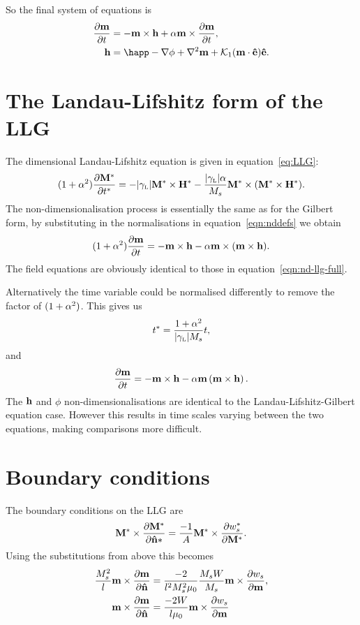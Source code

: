 So the final system of equations is
\begin{equation}
  \begin{aligned}
    \dmdt &= - \mv \times \hv + \alpha \mv \times \dmdt, \\
    \hv &= \happ - \nabla \phi + \lap \mv + \kone (\mv \cdot \ev) \ev.
    \label{eqn:nd-llg-full}
  \end{aligned}
\end{equation}

\section{The Landau-Lifshitz form of the LLG}
\label{sec:land-lifsh-normalisation}

The dimensional Landau-Lifshitz equation is given in equation~\eqref{eq:LLG}:
\begin{equation}
  \label{eq:LLG-dim}
  (1 + \alpha^2) \frac{\partial \mathbf{M}^*}{\partial t^*} = - {\left|{\gamma_{\text{\tiny{L}}}} \right|} \mathbf{M}^* \times \mathbf{H}^*
  - \frac{{\left|{\gamma_{\text{\tiny{L}}}} \right|} \alpha}{M_s} \mathbf{M}^* \times (\mathbf{M}^* \times \mathbf{H}^*).
\end{equation}
The non-dimensionalisation process is essentially the same as for the Gilbert form, by substituting in the normalisations in equation~\eqref{eqn:nddefs} we obtain
\begin{equation}
  (1 + \alpha^2) \frac{\partial \mathbf{m}}{\partial t} = - \mathbf{m} \times \mathbf{h} - \alpha \mathbf{m} \times (\mathbf{m} \times \mathbf{h}).
\end{equation}
The field equations are obviously identical to those in equation~\eqref{eqn:nd-llg-full}.


Alternatively the time variable could be normalised differently to remove the factor of $(1 + \alpha^2)$. 
This gives us
\begin{equation}
  t^* = \frac{1 + \alpha^2}{{\left|{\gamma_{\text{\tiny{L}}}} \right|} M_s} t,
\end{equation}
and
\begin{equation}
  \frac{\partial \mathbf{m}}{\partial t} = -\mathbf{m} \times \mathbf{h} -\alpha \mathbf{m} \left(\mathbf{m} \times \mathbf{h} \right).
\end{equation}
The $\mathbf{h}$ and $\phi$ non-dimensionalisations are identical to the Landau-Lifshitz-Gilbert equation case.
However this results in time scales varying between the two equations, making comparisons more difficult.

\section{Boundary conditions}
\label{sec:non-dim-boundary-conditions}

The boundary conditions on the LLG are
\begin{equation}
  \mathbf{M}^* \times \frac{\partial \mathbf{M}^*}{\partial \mathbf{\hat{n}}*} = \frac{-1}{A} \mathbf{M}^* \times \frac{\partial w_s^*}{\partial \mathbf{M}^*}.
\end{equation}
Using the substitutions from above this becomes
\begin{equation}
  \begin{aligned}
    \frac{M_s^2}{l} \mathbf{m} \times \frac{\partial \mathbf{m}}{\partial \mathbf{\hat{n}}} &= \frac{-2}{l^2 M_s^2 \mu_0} \frac{M_s W}{M_s} \mathbf{m} \times \frac{\partial w_s}{\partial \mathbf{m}}, \\
    \mathbf{m} \times \frac{\partial \mathbf{m}}{\partial \mathbf{\hat{n}}} &= \frac{-2 W}{l \mu_0}  \mathbf{m} \times \frac{\partial w_s}{\partial \mathbf{m}}
  \end{aligned}
\end{equation}

